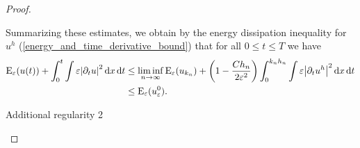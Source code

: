 \begin{proof}
\begin{description}[wide=0pt]
		Summarizing these estimates, we obtain by the energy dissipation inequality for $ u^{ h } $ (\ref{energy_and_time_derivative_bound}) that for all $ 0 \leq t \leq T $ we have
		\begin{align*}
			\operatorname{E}_{ \varepsilon } ( u ( t ) )
			+
			\int_{ 0 }^{ t }
			\int
			\varepsilon
			\abs{ \partial_{ t } u }^{ 2 }
			\dd{ x }
			\dd{ t }
			& \leq
			\liminf_{ n \to \infty }
			\operatorname{E}_{ \varepsilon } ( u_{ k_{ n } } )
			+
			\left( 1 - \frac{ C h_{ n } }{ 2 \varepsilon^{ 2 } } \right)
			\int_{ 0 }^{ k_{ n } h_{ n } }
			\int
			\varepsilon
			\abs{ \partial_{ t } u^{ h } }^{ 2 }
			\dd{ x }
			\dd{ t }
			\\
			& \leq
			\operatorname{E}_{ \varepsilon } ( u_{ \varepsilon }^{ 0 } ).
		\end{align*}
		
		\item[Step 8:] Additional regularity 2
		

\end{description}
\end{proof}
